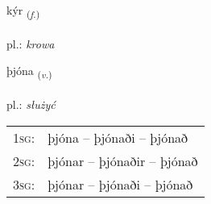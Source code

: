 \documentclass[frontgrid, backgrid]{flacards}\usepackage[]{graphicx}\usepackage[]{xcolor}
\begin{document}
\renewcommand{\flhead}{\vskip5pt \fboxsep=0pt {\small\bfseries\footnotesize Nafnorð | Noun}}
\renewcommand{\fcfoot}{\vskip5pt \fboxsep=0pt \hspace{2pt}{\small\bfseries\footnotesize 2K}}

\renewcommand{\blhead}{\vskip5pt {\small\bfseries\footnotesize Nafnorð | Noun }}
\renewcommand{\bcfoot}{\vskip5pt \hspace{2pt}{\small\bfseries\footnotesize 2K}}


{kýr \small{\textsubscript{(\textit{f.})}} \\[1ex] %
\textphonetic{[cʰiːr]} \\
pl.: \emph{krowa} \\  [2ex]
\renewcommand*{\arraystretch}{0.8}
}

\renewcommand{\flhead}{\vskip5pt \fboxsep=0pt {\small\bfseries\footnotesize Sagnorð | Verb}}
\renewcommand{\fcfoot}{\vskip5pt \fboxsep=0pt \hspace{2pt}{\small\bfseries\footnotesize 2K}}

\renewcommand{\blhead}{\vskip5pt {\small\bfseries\footnotesize Sagnorð | Verb }}
\renewcommand{\bcfoot}{\vskip5pt \hspace{2pt}{\small\bfseries\footnotesize 2K}}


{þjóna \small{\textsubscript{(\textit{v.})}} \\[1ex] %
\textphonetic{[θjouːna]} \\
pl.: \emph{służyć} \\  [2ex]
\renewcommand*{\arraystretch}{0.8}
\begin{tabular}{p{1cm}l}
\textsc{1sg}: & þjóna -- þjónaði -- þjónað \\ 
\textsc{2sg}: & þjónar -- þjónaðir -- þjónað \\ 
\textsc{3sg}: & þjónar -- þjónaði -- þjónað \\ 
\end{tabular}
}
\end{document}
